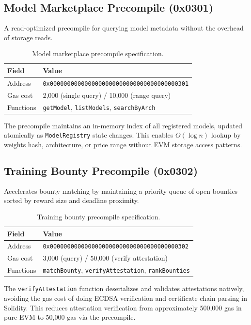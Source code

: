 \subsection{Model Marketplace Precompile (0x0301)}

A read-optimized precompile for querying model metadata without the overhead of storage reads.

\begin{table}[h]
\centering
\caption{Model marketplace precompile specification.}
\label{tab:precompile-0301}
\begin{tabular}{@{}ll@{}}
\toprule
Field & Value \\
\midrule
Address & \texttt{0x0000000000000000000000000000000000000301} \\
Gas cost & 2,000 (single query) / 10,000 (range query) \\
Functions & \texttt{getModel}, \texttt{listModels}, \texttt{searchByArch} \\
\bottomrule
\end{tabular}
\end{table}

The precompile maintains an in-memory index of all registered models, updated atomically as \texttt{ModelRegistry} state changes. This enables $O(\log n)$ lookup by weights hash, architecture, or price range without EVM storage access patterns.

\subsection{Training Bounty Precompile (0x0302)}

Accelerates bounty matching by maintaining a priority queue of open bounties sorted by reward size and deadline proximity.

\begin{table}[h]
\centering
\caption{Training bounty precompile specification.}
\label{tab:precompile-0302}
\begin{tabular}{@{}ll@{}}
\toprule
Field & Value \\
\midrule
Address & \texttt{0x0000000000000000000000000000000000000302} \\
Gas cost & 3,000 (query) / 50,000 (verify attestation) \\
Functions & \texttt{matchBounty}, \texttt{verifyAttestation}, \texttt{rankBounties} \\
\bottomrule
\end{tabular}
\end{table}

The \texttt{verifyAttestation} function deserializes and validates \TEE{} attestations natively, avoiding the gas cost of doing ECDSA verification and certificate chain parsing in Solidity. This reduces attestation verification from approximately 500,000 gas in pure EVM to 50,000 gas via the precompile.

